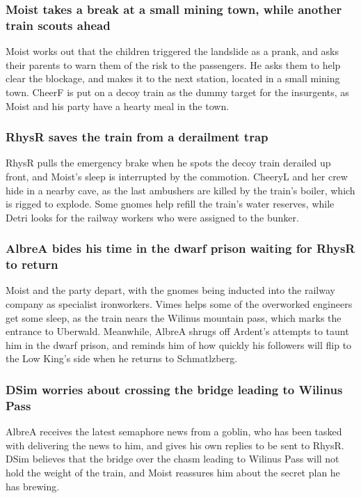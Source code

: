\subsubsection{\Gls{Moist} takes a break at a small mining town, while another train scouts ahead}
\Gls{Moist} works out that the children triggered the landslide as a prank, and asks their parents
to warn them of the risk to the passengers. He asks them to help clear the blockage, and makes it
to the next station, located in a small mining town. \Gls{CheerF} is put on a decoy train as the
dummy target for the insurgents, as \Gls{Moist} and his party have a hearty meal in the town.

\subsubsection{\Gls{RhysR} saves the train from a derailment trap}
\Gls{RhysR} pulls the emergency brake when he spots the decoy train derailed up front, and
\Gls{Moist}'s sleep is interrupted by the commotion. \Gls{CheeryL} and her crew hide in a nearby
cave, as the last ambushers are killed by the train's boiler, which is rigged to explode. Some
gnomes help refill the train's water reserves, while \Gls{Detri} looks for the railway workers who
were assigned to the bunker.

\subsubsection{\Gls{AlbreA} bides his time in the dwarf prison waiting for \Gls{RhysR} to return}
\Gls{Moist} and the party depart, with the gnomes being inducted into the railway company as
specialist ironworkers. \Gls{Vimes} helps some of the overworked engineers get some sleep, as the
train nears the Wilinus mountain pass, which marks the entrance to Uberwald. Meanwhile, \Gls{AlbreA}
shrugs off \Gls{Ardent}'s attempts to taunt him in the dwarf prison, and reminds him of how quickly
his followers will flip to the Low King's side when he returns to Schmatlzberg.

\subsubsection{\Gls{DSim} worries about crossing the bridge leading to Wilinus Pass}
\Gls{AlbreA} receives the latest semaphore news from a goblin, who has been tasked with delivering
the news to him, and gives his own replies to be sent to \Gls{RhysR}. \Gls{DSim} believes that the
bridge over the chasm leading to Wilinus Pass will not hold the weight of the train, and \Gls{Moist}
reassures him about the secret plan he has brewing.

